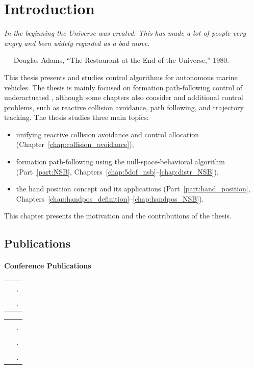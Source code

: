 \chapter{Introduction}
\label{chap:introduction}

\setlength{\epigraphwidth}{0.5\textwidth}
\epigraph{ \it
    In the beginning the Universe was created.
    This has made a lot of people very angry and been widely regarded as a bad move.
}{--- Douglas Adams, ``The Restaurant at the End of the Universe,'' 1980.}

This thesis presents and studies control algorithms for autonomous marine vehicles.
The thesis is mainly focused on formation path-following control of underactuated , although some chapters also consider  and additional control problems, such as reactive collision avoidance, path following, and trajectory tracking.
The thesis studies three main topics:
\begin{itemize}
    \item unifying reactive collision avoidance and control allocation (Chapter~\ref{chap:collision_avoidance}),
    \item formation path-following using the null-space-behavioral algorithm (Part~\ref{part:NSB}, Chapters~\ref{chap:5dof_nsb}--\ref{chap:distr_NSB}),
    \item the hand position concept and its applications (Part~\ref{part:hand_position}, Chapters~\ref{chap:handpos_definition}--\ref{chap:handpos_NSB}).
\end{itemize}
This chapter presents the motivation and the contributions of the thesis.





\vspace*{-0.25em}
\section{Publications}
\vspace*{-0.5em}
\newcommand{\tablecite}[1]{\cite{#1} & \fullcite{#1}.}

\subsubsection{Conference Publications}
\begin{tabularx}{\textwidth}{rX}
    \tablecite{matous_unifying_2021} \\
    \tablecite{matouvs_formation_2022}
\end{tabularx}
\begin{tabularx}{\textwidth}{rX}
    \tablecite{matous_singularity_2023} \\
    \tablecite{matous_MPC_2022} \\
    \tablecite{restrepo_formation_2022}
\end{tabularx}

